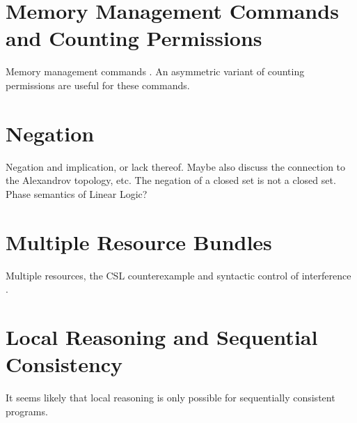 \documentclass[11pt]{report}
\begin{document}









 

\section{Memory Management Commands and Counting Permissions}

Memory management commands \cite{wmsldetails,lola11}. An asymmetric variant of counting permissions are useful for these commands. 

\section{Negation}
    
Negation and implication, or lack thereof. Maybe also discuss the connection to the Alexandrov topology, etc. The negation of a closed set is not a closed set. Phase semantics of Linear Logic? 

\section{Multiple Resource Bundles}

Multiple resources, the CSL counterexample \cite{Brookes20115} and syntactic control of interference \cite{DBLP:conf/popl/ReddyR12}.  

\section{Local Reasoning and Sequential Consistency}

It seems likely that local reasoning is only possible for sequentially consistent programs. 
\end{document}
